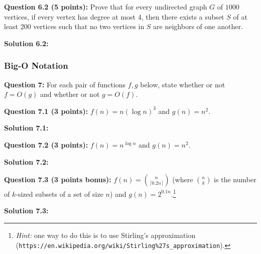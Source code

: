 \documentclass[11pt]{article}
\newcommand{\binom}[2]{{#1 \choose #2}}
\begin{document}
\textbf{Question 6.2 (5 points):} Prove that for every undirected graph
\(G\) of \(1000\) vertices, if every vertex has degree at most \(4\),
then there exists a subset \(S\) of at least \(200\) vertices such that
no two vertices in \(S\) are neighbors of one another.

\textbf{Solution 6.2:}


\subsubsection{Big-O Notation}\label{big-o-notation}

\textbf{Question 7:} For each pair of functions \(f,g\) below, state
whether or not \(f=O(g)\) and whether or not \(g=O(f)\).

\textbf{Question 7.1 (3 points):} \(f(n)=n(\log n)^3\) and \(g(n)=n^2\).

\textbf{Solution 7.1:}

\textbf{Question 7.2 (3 points):} \(f(n)= n^{\log n}\) and
\(g(n) = n^2\).

\textbf{Solution 7.2:}

\textbf{Question 7.3 (3 points bonus):}
\(f(n) = \binom{n}{\lceil 0.2 n \rceil}\) (where \(\binom{n}{k}\) is the
number of \(k\)-sized subsets of a set of size \(n\)) and
\(g(n) = 2^{0.1 n}\).\footnote{\emph{Hint:} one way to do this is to use
  {Stirling's approximation} ({\tt https://en.wikipedia.org/wiki/Stirling\%27s\_approximation}).}

\textbf{Solution 7.3:}
\end{document}
